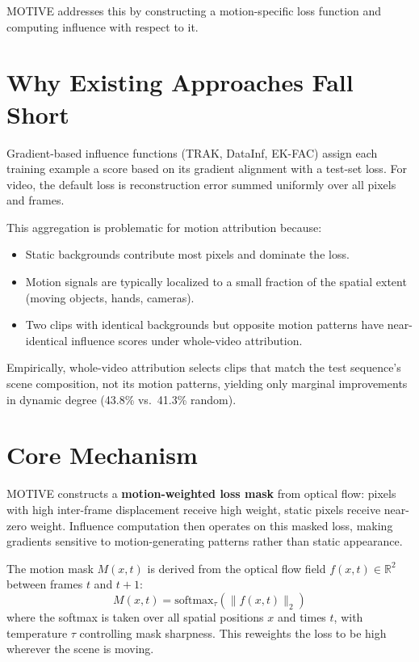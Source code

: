 \documentclass[10pt,twocolumn]{article}
\begin{document}
MOTIVE addresses this by constructing a motion-specific loss function and
computing influence with respect to it.

\section{Why Existing Approaches Fall Short}

Gradient-based influence functions (TRAK, DataInf, EK-FAC) assign each
training example a score based on its gradient alignment with a test-set
loss. For video, the default loss is reconstruction error summed uniformly
over all pixels and frames.

This aggregation is problematic for motion attribution because:
\begin{itemize}[itemsep=2pt,parsep=0pt]
  \item Static backgrounds contribute most pixels and dominate the loss.
  \item Motion signals are typically localized to a small fraction of
    the spatial extent (moving objects, hands, cameras).
  \item Two clips with identical backgrounds but opposite motion patterns
    have near-identical influence scores under whole-video attribution.
\end{itemize}

Empirically, whole-video attribution selects clips that match the test
sequence's scene composition, not its motion patterns, yielding only
marginal improvements in dynamic degree (43.8\% vs.\ 41.3\% random).

\section{Core Mechanism}

MOTIVE constructs a \textbf{motion-weighted loss mask} from optical flow:
pixels with high inter-frame displacement receive high weight, static
pixels receive near-zero weight. Influence computation then operates on
this masked loss, making gradients sensitive to motion-generating
patterns rather than static appearance.

The motion mask $M(x,t)$ is derived from the optical flow field
$f(x,t) \in \mathbb{R}^2$ between frames $t$ and $t{+}1$:
\[
M(x,t) = \mathrm{softmax}_\tau\!\left(\|f(x,t)\|_2\right)
\]
where the softmax is taken over all spatial positions $x$ and times $t$,
with temperature $\tau$ controlling mask sharpness. This reweights the
loss to be high wherever the scene is moving.
\end{document}
